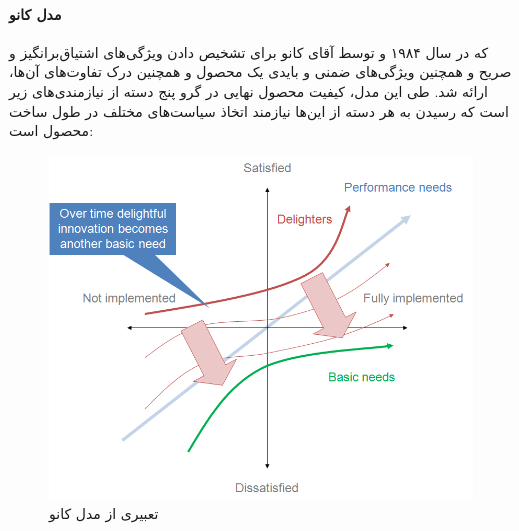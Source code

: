 \paragraph{مدل کانو}
که در سال ۱۹۸۴ و توسط آقای کانو
\cite{kano_attractive_1984}
برای تشخیص دادن ویژگی‌های اشتیاق‌برانگیز و صریح و همچنین ویژگی‌های ضمنی و بایدی یک محصول و همچنین درک تفاوت‌های آن‌ها، ارائه شد. طی این مدل، کیفیت محصول نهایی در گرو پنج دسته از نیازمندی‌های زیر است که رسیدن به هر دسته از این‌ها نیازمند اتخاذ سیاست‌های مختلف در طول ساخت محصول است:
\begin{figure}[H]
	\centering
	\includegraphics[width=13cm]{Resources/kano_model.PNG}
	\caption[تعبیری از مدل کانو]	{
		تعبیری از مدل کانو
		\cite{noauthor_kano_2018}
	}
	\label{fig:kano}
\end{figure}
